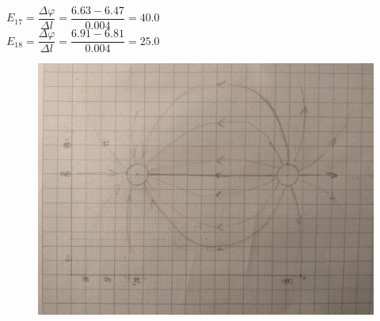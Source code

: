 $
E_{17} = 
\dfrac{\varDelta \varphi}{\varDelta l} =
\dfrac{6.63 - 6.47}{0.004} = 
40.0
$\\


$
E_{18} = 
\dfrac{\varDelta \varphi}{\varDelta l} =
\dfrac{6.91 - 6.81}{0.004} = 
25.0
$\\

\begin{figure}
    \centering
    \includegraphics[width=\linewidth,angle=180]{photo/s}
\end{figure}



